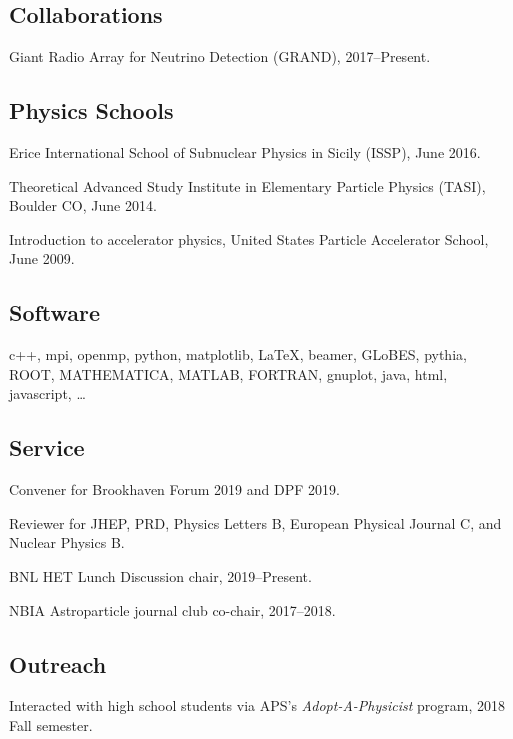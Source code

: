 \documentclass{article}
\renewenvironment{itemize}{
\begin{list}{}{
\setlength{\leftmargin}{.5em}}}{
\end{list}}
\begin{document}
\subsection*{Collaborations}
\begin{itemize}
\item Giant Radio Array for Neutrino Detection (GRAND), 2017--Present.
\end{itemize}

\subsection*{Physics Schools}
\begin{itemize}
\item Erice International School of Subnuclear Physics in Sicily (ISSP), June 2016.
\item Theoretical Advanced Study Institute in Elementary Particle Physics (TASI), Boulder CO, June 2014.
\item Introduction to accelerator physics, United States Particle Accelerator School, June 2009.
\end{itemize}

\subsection*{Software}
\begin{itemize}
\item 
c++, mpi, openmp, python, matplotlib, \LaTeX, beamer, GLoBES, pythia, ROOT, MATHEMATICA, MATLAB, FORTRAN, gnuplot, java, html, javascript, \dots
\end{itemize}

\subsection*{Service}
\begin{itemize}
\item Convener for Brookhaven Forum 2019 and DPF 2019.
\item Reviewer for JHEP, PRD, Physics Letters B, European Physical Journal C, and Nuclear Physics B.
\item BNL HET Lunch Discussion chair, 2019--Present.
\item NBIA Astroparticle journal club co-chair, 2017--2018.
\end{itemize}

\subsection*{Outreach}
\begin{itemize}
\item Interacted with high school students via APS's \emph{Adopt-A-Physicist} program, 2018 Fall semester.
\end{itemize}
\end{document}
